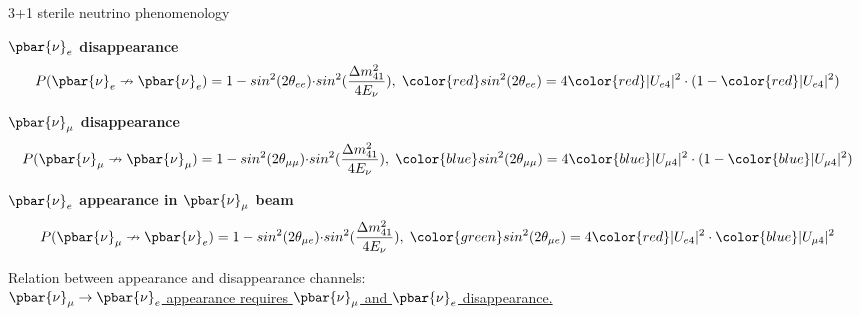 \begin{frame}[t]{3+1 sterile neutrino phenomenology}

\begin{itemize}
{\small
\item {\bf \color{red} $\pbar{\nu}_{e}$ disappearance}
     \[
        \displaystyle
        P(\pbar{\nu}_{e} \nrightarrow \pbar{\nu}_{e})     = 1 - sin^{2}(2\theta_{ee})    {\cdot}sin^{2}(\frac{{\Delta}m^{2}_{41}}{4E_{\nu}}),\hspace{0.1cm}
        {\color{red}sin^{2}(2\theta_{ee})} = 4 {\color{red}|U_{e4}|^{2}} \cdot (1-{\color{red} |U_{e4}|^{2}})
     \]
\item {\bf \color{blue} $\pbar{\nu}_{\mu}$ disappearance}
     \[
        \displaystyle
        P(\pbar{\nu}_{\mu} \nrightarrow \pbar{\nu}_{\mu}) = 1 - sin^{2}(2\theta_{\mu\mu}){\cdot}sin^{2}(\frac{{\Delta}m^{2}_{41}}{4E_{\nu}}),\hspace{0.1cm}
        {\color{blue}sin^{2}(2\theta_{\mu\mu})} = 4 {\color{blue}|U_{{\mu}4}|^{2}} \cdot (1-{\color{blue}|U_{{\mu}4}|^{2}})
     \]
\item {\bf \color{green} $\pbar{\nu}_{e}$ appearance in $\pbar{\nu}_{\mu}$ beam}
     \[
        \displaystyle
        P(\pbar{\nu}_{\mu} \nrightarrow \pbar{\nu}_{e})   = 1 - sin^{2}(2\theta_{{\mu}e}){\cdot}sin^{2}(\frac{{\Delta}m^{2}_{41}}{4E_{\nu}}),\hspace{0.1cm}
        {\color{green}sin^{2}(2\theta_{{\mu}e})} = 4 {\color{red} |U_{e4}|^{2}} \cdot {\color{blue} |U_{{\mu}4}|^{2}}
     \]
}
\end{itemize}
\begin{center}
Relation between appearance and disappearance channels:\\
\underline{$\pbar{\nu}_{\mu} \rightarrow \pbar{\nu}_{e}$ appearance requires $\pbar{\nu}_{\mu}$ and $\pbar{\nu}_{e}$ disappearance.}
\end{center}
\end{frame}

%
%
%

